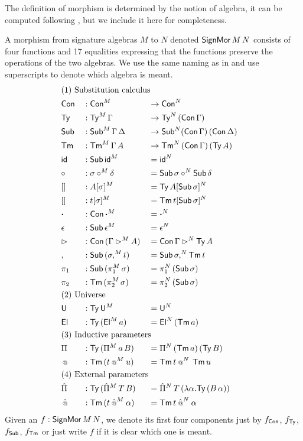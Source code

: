 \documentclass[a4paper,UKenglish,cleveref, autoref]{lipics-v2019}
\begin{document}
The definition of morphism is determined by the notion of algebra, it
can be computed following \cite{large_inf_qiit}, but we include it
here for completeness.
\begin{definition}\label{def:morphism}
  A morphism from signature algebras $M$ to $N$ denoted
  $\mathsf{SignMor}\,M\,N$ consists of four functions and 17 equalities
  expressing that the functions preserve the operations of the two
  algebras. We use the same naming as in  and use
  superscripts to denote which algebra is meant.
\begin{alignat*}{5}
  & \rlap{(1) Substitution calculus} \\
  & \Con && : \Con^M && \ra\Con^N \\
  & \Ty  && : \Ty^M\,\Gamma && \ra\Ty^N\,(\Con\,\Gamma) \\
  & \Sub  && : \Sub^M\,\Gamma\,\Delta && \ra\Sub^N(\Con\,\Gamma)\,(\Con\,\Delta) \\
  & \Tm  && : \Tm^M\,\Gamma\,A && \ra\Tm^N\,(\Con\,\Gamma)\,(\Ty\,A) \\
  & \id && : \Sub\,\id^M && = \id^N \\
  & {\circ} && : \sigma\circ^M\delta && = \Sub\,\sigma\circ^N\Sub\,\delta \\
  & [] && : A[\sigma]^M && = \Ty\,A[\Sub\,\sigma]^N \\
  & [] && : t[\sigma]^M && = \Tm\,t[\Sub\,\sigma]^N \\
  & \boldsymbol{\cdot} && : \Con\,\boldsymbol{\cdot}^M && = \boldsymbol{\cdot}^N \\
  & \epsilon && : \Sub\,\epsilon^M && = \epsilon^N \\
  & \ext && : \Con\,(\Gamma\ext^M A) && = \Con\,\Gamma\ext^N\Ty\,A \\
  & , && : \Sub\,(\sigma,^M t) && = \Sub\,\sigma ,^N\Tm\,t \\
  & \pi_1 && : \Sub\,(\pi_1^M\,\sigma) && = \pi_1^N\,(\Sub\,\sigma) \\
  & \pi_2 && : \Tm\,(\pi_2^M\,\sigma) && = \pi_2^N\,(\Sub\,\sigma) \\
  & \rlap{(2) Universe} \\
  & \U && : \Ty\,\U^M && = \U^N \\
  & \El && : \Ty\,(\El^M\,a) && = \El^N\,(\Tm\,a) \\
  & \rlap{(3) Inductive parameters} \\
  & \Pi && : \Ty\,(\Pi^M\,a\,B) && = \Pi^N\,(\Tm\,a)\,(\Ty\,B) \\
  & \oldapp && : \Tm\,(t\mathbin{{\oldapp}^M} u) && = \Tm\,t\mathbin{{\oldapp}^N}\,\Tm\,u \\
  & \rlap{(4) External parameters} \\
  & \Pim && : \Ty\,(\Pim^M\,T\,B) && = \Pim^N\,T\,(\lambda\alpha.\Ty\,(B\,\alpha)) \\
  & \appm && : \Tm\,(t\mathbin{{\appm}^M}\alpha) && = \Tm\,t\mathbin{{\appm}^N}\alpha
\end{alignat*}
Given an $f:\mathsf{SignMor}\,M\,N$, we denote its first four components just
by $f_{\mathsf{Con}}$, $f_{\mathsf{Ty}}$, $f_{\mathsf{Sub}}$, $f_{\mathsf{Tm}}$ or just write $f$ if it is
clear which one is meant.
\end{definition}
\end{document}
